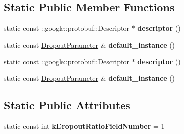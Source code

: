 \subsection*{Static Public Member Functions}
\begin{DoxyCompactItemize}
\item 
\mbox{\label{classcaffe_1_1_dropout_parameter_a6d5961bf7f63706afb8ab4fe2e6ff6a9}} 
static const \+::google\+::protobuf\+::\+Descriptor $\ast$ {\bfseries descriptor} ()
\item 
\mbox{\label{classcaffe_1_1_dropout_parameter_ac4aea2072836c60d122ef0b34ff129c4}} 
static const \mbox{\hyperlink{classcaffe_1_1_dropout_parameter}{Dropout\+Parameter}} \& {\bfseries default\+\_\+instance} ()
\item 
\mbox{\label{classcaffe_1_1_dropout_parameter_afdd26aa55bd381e6a891ab3798f42488}} 
static const \+::google\+::protobuf\+::\+Descriptor $\ast$ {\bfseries descriptor} ()
\item 
\mbox{\label{classcaffe_1_1_dropout_parameter_aa04e2afb626dfb3c5ed72042da332f9a}} 
static const \mbox{\hyperlink{classcaffe_1_1_dropout_parameter}{Dropout\+Parameter}} \& {\bfseries default\+\_\+instance} ()
\end{DoxyCompactItemize}
\subsection*{Static Public Attributes}
\begin{DoxyCompactItemize}
\item 
\mbox{\label{classcaffe_1_1_dropout_parameter_a289709f121a8d55b8d261909250f0e05}} 
static const int {\bfseries k\+Dropout\+Ratio\+Field\+Number} = 1
\end{DoxyCompactItemize}
